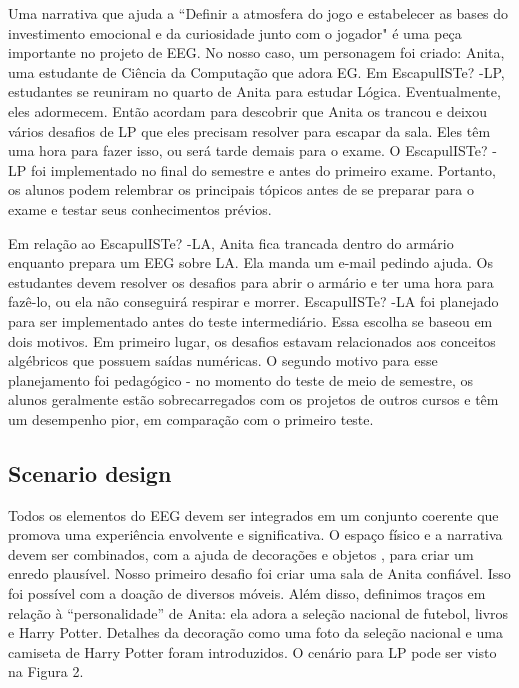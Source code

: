 Uma narrativa que ajuda a “Definir a atmosfera do jogo e estabelecer as bases do investimento emocional e da curiosidade junto com o jogador" \citep{clarke_escaped_2017} é uma peça importante no projeto de EEG. No nosso caso, um personagem foi criado: Anita, uma estudante de Ciência da Computação que adora EG. Em EscapulISTe? -LP, estudantes se reuniram no quarto de Anita para estudar Lógica. Eventualmente, eles adormecem. Então acordam para descobrir que Anita os trancou e deixou vários desafios de LP que eles precisam resolver para escapar da sala. Eles têm uma hora para fazer isso, ou será tarde demais para o exame. O EscapulISTe? -LP foi implementado no final do semestre e antes do primeiro exame. Portanto, os alunos podem relembrar os principais tópicos antes de se preparar para o exame e testar seus conhecimentos prévios.

Em relação ao EscapulISTe? -LA, Anita fica trancada dentro do armário enquanto prepara um EEG sobre LA. Ela manda um e-mail pedindo ajuda. Os estudantes devem resolver os desafios para abrir o armário e ter uma hora para fazê-lo, ou ela não conseguirá respirar e morrer. EscapulISTe? -LA foi planejado para ser implementado antes do teste intermediário. Essa escolha se baseou em dois motivos. Em primeiro lugar, os desafios estavam relacionados aos conceitos algébricos que possuem saídas numéricas. O segundo motivo para esse planejamento foi pedagógico - no momento do teste de meio de semestre, os alunos geralmente estão sobrecarregados com os projetos de outros cursos e têm um desempenho pior, em comparação com o primeiro teste.

\subsection{Scenario design}

Todos os elementos do EEG devem ser integrados em um conjunto coerente que promova uma experiência envolvente e significativa. O espaço físico e a narrativa devem ser combinados, com a ajuda de decorações e objetos \citep{guigon_model_2018}, para criar um enredo plausível. Nosso primeiro desafio foi criar uma sala de Anita confiável. Isso foi possível com a doação de diversos móveis. Além disso, definimos traços em relação à “personalidade” de Anita: ela adora a seleção nacional de futebol, livros e Harry Potter. Detalhes da decoração como uma foto da seleção nacional e uma camiseta de Harry Potter foram introduzidos. O cenário para LP pode ser visto na Figura 2.

